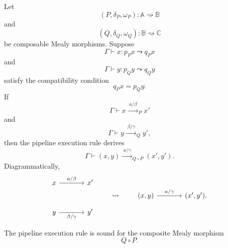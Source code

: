 \begin{definition}
\label{def:pipeline-execution-rule}
    Let
    \[
        (P,\delta_P,\omega_P):\mathbb A\rightsquigarrow\mathbb B
    \]
    and
    \[
        (Q,\delta_Q,\omega_Q):\mathbb B\rightsquigarrow\mathbb C
    \]
    be composable Mealy morphisms. Suppose
    \[
        \Gamma\vdash x:p_Px\leadsto q_Px
    \]
    and
    \[
        \Gamma\vdash y:p_Qy\leadsto q_Qy
    \]
    satisfy the compatibility condition
    \[
        q_Px=p_Qy.
    \]
    If
    \[
        \Gamma\vdash
        x\xrightarrow{\;a/\beta\;}_{P}x'
    \]
    and
    \[
        \Gamma\vdash
        y\xrightarrow{\;\beta/\gamma\;}_{Q}y',
    \]
    then the pipeline execution rule derives
    \[
        \Gamma\vdash
        (x,y)\xrightarrow{\;a/\gamma\;}_{Q\circ P}(x',y').
    \]
    Diagrammatically,
    \[
        \begin{tikzcd}[column sep=large, row sep=large]
            x
                \arrow[r, "{a/\beta}"]
            &
            x'
            \\
            y
                \arrow[r, "{\beta/\gamma}"']
            &
            y'
        \end{tikzcd}
        \qquad\leadsto\qquad
        \begin{tikzcd}[column sep=large]
            (x,y)
                \arrow[r, "{a/\gamma}"]
            &
            (x',y') .
        \end{tikzcd}
    \]
\end{definition}

\begin{proposition}
\label{prop:soundness-pipeline-execution}
    The pipeline execution rule is sound for the composite Mealy morphism
    \[
        Q\circ P.
    \]
\end{proposition}

